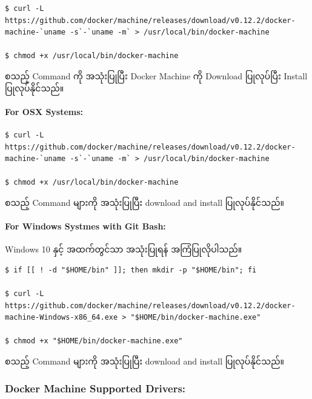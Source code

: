 \documentclass[]{article}
\let\oldparagraph\paragraph
\renewcommand{\paragraph}[1]{\oldparagraph{#1}\mbox{}}
\begin{document}
\begin{verbatim}
$ curl -L https://github.com/docker/machine/releases/download/v0.12.2/docker-machine-`uname -s`-`uname -m` > /usr/local/bin/docker-machine

$ chmod +x /usr/local/bin/docker-machine
\end{verbatim}

စသည့် Command ကို အသုံးပြုပြီး Docker Machine ကို Download ပြုလုပ်ပြီး
Install ပြုလုပ်နိုင်သည်။

\hypertarget{for-osx-systems}{%
\paragraph{For OSX Systems:}\label{for-osx-systems}}

\begin{verbatim}
$ curl -L https://github.com/docker/machine/releases/download/v0.12.2/docker-machine-`uname -s`-`uname -m` > /usr/local/bin/docker-machine

$ chmod +x /usr/local/bin/docker-machine
\end{verbatim}

စသည့် Command များကို အသုံးပြုပြီး download and install ပြုလုပ်နိုင်သည်။

\hypertarget{for-windows-systmes-with-git-bash}{%
\paragraph{For Windows Systmes with Git
Bash:}\label{for-windows-systmes-with-git-bash}}

Windows 10 နှင့် အထက်တွင်သာ အသုံးပြုရန် အကြံပြုလိုပါသည်။

\begin{verbatim}
$ if [[ ! -d "$HOME/bin" ]]; then mkdir -p "$HOME/bin"; fi

$ curl -L https://github.com/docker/machine/releases/download/v0.12.2/docker-machine-Windows-x86_64.exe > "$HOME/bin/docker-machine.exe"

$ chmod +x "$HOME/bin/docker-machine.exe"
\end{verbatim}

စသည့် Command များကို အသုံးပြုပြီး download and install ပြုလုပ်နိုင်သည်။

\hypertarget{docker-machine-supported-drivers}{%
\subsubsection{Docker Machine Supported
Drivers:}\label{docker-machine-supported-drivers}}
\end{document}
